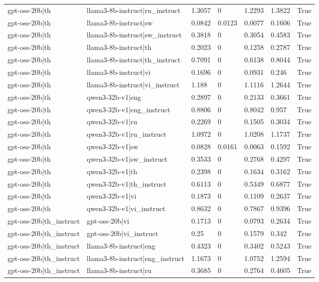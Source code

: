 \begin{table}
\begin{tabular}{llllllr}
gpt-oss-20b|th & llama3-8b-instruct|ru_instruct & 1.3057 & 0 & 1.2293 & 1.3822 & True \\
gpt-oss-20b|th & llama3-8b-instruct|sw & 0.0842 & 0.0123 & 0.0077 & 0.1606 & True \\
gpt-oss-20b|th & llama3-8b-instruct|sw_instruct & 0.3818 & 0 & 0.3054 & 0.4583 & True \\
gpt-oss-20b|th & llama3-8b-instruct|th & 0.2023 & 0 & 0.1258 & 0.2787 & True \\
gpt-oss-20b|th & llama3-8b-instruct|th_instruct & 0.7091 & 0 & 0.6138 & 0.8044 & True \\
gpt-oss-20b|th & llama3-8b-instruct|vi & 0.1696 & 0 & 0.0931 & 0.246 & True \\
gpt-oss-20b|th & llama3-8b-instruct|vi_instruct & 1.188 & 0 & 1.1116 & 1.2644 & True \\
gpt-oss-20b|th & qwen3-32b-v1|eng & 0.2897 & 0 & 0.2133 & 0.3661 & True \\
gpt-oss-20b|th & qwen3-32b-v1|eng_instruct & 0.8806 & 0 & 0.8042 & 0.957 & True \\
gpt-oss-20b|th & qwen3-32b-v1|ru & 0.2269 & 0 & 0.1505 & 0.3034 & True \\
gpt-oss-20b|th & qwen3-32b-v1|ru_instruct & 1.0972 & 0 & 1.0208 & 1.1737 & True \\
gpt-oss-20b|th & qwen3-32b-v1|sw & 0.0828 & 0.0161 & 0.0063 & 0.1592 & True \\
gpt-oss-20b|th & qwen3-32b-v1|sw_instruct & 0.3533 & 0 & 0.2768 & 0.4297 & True \\
gpt-oss-20b|th & qwen3-32b-v1|th & 0.2398 & 0 & 0.1634 & 0.3162 & True \\
gpt-oss-20b|th & qwen3-32b-v1|th_instruct & 0.6113 & 0 & 0.5349 & 0.6877 & True \\
gpt-oss-20b|th & qwen3-32b-v1|vi & 0.1873 & 0 & 0.1109 & 0.2637 & True \\
gpt-oss-20b|th & qwen3-32b-v1|vi_instruct & 0.8632 & 0 & 0.7867 & 0.9396 & True \\
gpt-oss-20b|th_instruct & gpt-oss-20b|vi & 0.1713 & 0 & 0.0793 & 0.2634 & True \\
gpt-oss-20b|th_instruct & gpt-oss-20b|vi_instruct & 0.25 & 0 & 0.1579 & 0.342 & True \\
gpt-oss-20b|th_instruct & llama3-8b-instruct|eng & 0.4323 & 0 & 0.3402 & 0.5243 & True \\
gpt-oss-20b|th_instruct & llama3-8b-instruct|eng_instruct & 1.1673 & 0 & 1.0752 & 1.2594 & True \\
gpt-oss-20b|th_instruct & llama3-8b-instruct|ru & 0.3685 & 0 & 0.2764 & 0.4605 & True \\

\end{tabular}
\end{table}
